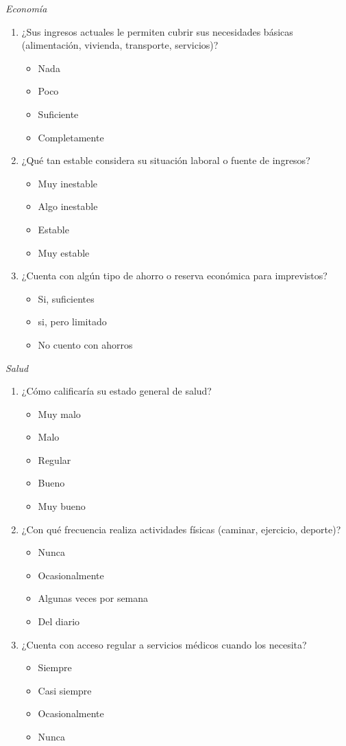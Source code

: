\documentclass{article}
\begin{document}
\textit{Economía}
\begin{enumerate}
	\item ¿Sus ingresos actuales le permiten cubrir sus necesidades básicas (alimentación, vivienda, transporte, servicios)?
	\begin{itemize}
		\item Nada
		\item Poco
		\item Suficiente
		\item Completamente
	\end{itemize}
	\item ¿Qué tan estable considera su situación laboral o fuente de ingresos?
	\begin{itemize}
		\item Muy inestable
		\item Algo inestable
		\item Estable
		\item Muy estable
	\end{itemize}
	\item ¿Cuenta con algún tipo de ahorro o reserva económica para imprevistos?
	\begin{itemize}
		\item Si, suficientes
		\item si, pero limitado
		\item No cuento con ahorros
	\end{itemize}
\end{enumerate}
\textit{Salud}
\begin{enumerate}
	\item ¿Cómo calificaría su estado general de salud?
	\begin{itemize}
		\item Muy malo
		\item Malo
		\item Regular
		\item Bueno
		\item Muy bueno
	\end{itemize}
	\item ¿Con qué frecuencia realiza actividades físicas (caminar, ejercicio, deporte)?
	\begin{itemize}
		\item Nunca
		\item Ocasionalmente
		\item Algunas veces por semana
		\item Del diario
	\end{itemize}
	\item ¿Cuenta con acceso regular a servicios médicos cuando los necesita?
	\begin{itemize}
		\item Siempre
		\item Casi siempre
		\item Ocasionalmente
		\item Nunca
	\end{itemize}
\end{enumerate}
\end{document}
